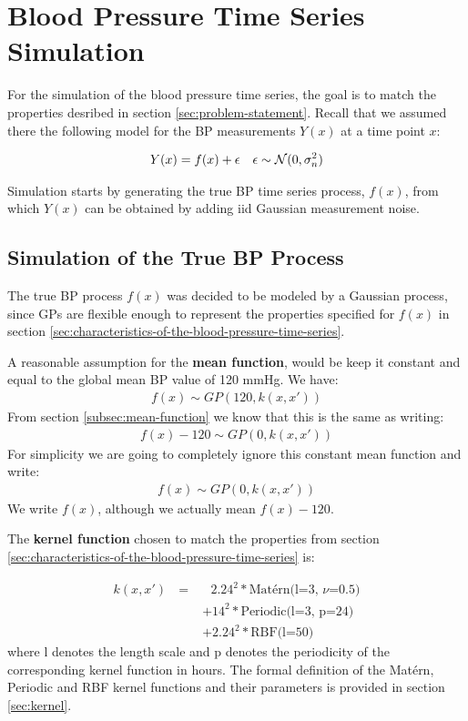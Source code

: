 \section{Blood Pressure Time Series Simulation}\label{sec:blood-pressure-time-series-simulation}
For the simulation of the blood pressure time series, the goal is to match the properties
desribed in section \ref{sec:problem-statement}.
Recall that we assumed there the following model for the BP measurements
$Y(x)$ at a time point $x$:

\begin{align*}
    Y(x) = f(x) + \epsilon && \epsilon \sim \operatorname{\mathcal{N}}(0, \sigma_n^{2})
\end{align*}

Simulation starts by generating the true BP time series process, $f(x)$,
from which $Y(x)$ can be obtained by adding iid Gaussian measurement noise.

\subsection{Simulation of the True BP Process}

The true BP process $f(x)$ was decided to be modeled by a Gaussian process,
since GPs are flexible enough to represent the properties
specified for $f(x)$ in section \ref{sec:characteristics-of-the-blood-pressure-time-series}.

A reasonable assumption for the \textbf{mean function}, would be keep it constant and
equal to the global mean BP value of 120 mmHg. We have:
\begin{gather*}
    f(x) \sim GP(120, k(x,x'))
\end{gather*}
From section \ref{subsec:mean-function} we know that this is the same as writing:
\begin{gather*}
    f(x) - 120 \sim GP(0, k(x,x'))
\end{gather*}
For simplicity we are going to completely ignore this constant
mean function and write:
\begin{gather*}
    f(x) \sim GP(0, k(x,x'))
\end{gather*}
We write $f(x)$, although we actually mean $f(x) - 120$.

The \textbf{kernel function} chosen to match the properties from
section \ref{sec:characteristics-of-the-blood-pressure-time-series} is:

\begin{align*}\label{def:true_gp}
    k(x, x') \text{ } = &\text{ } 2.24^{2} * \text{Matérn(l=3, $\nu$=0.5)} \\
             &+  14^{2} * \text{Periodic(l=3, p=24)} \\
             &+  2.24^{2} * \text{RBF(l=50)}
\end{align*}
where l denotes the length scale and p denotes the periodicity
of the corresponding kernel function in hours.
The formal definition of the Matérn, Periodic and RBF kernel
functions and their parameters is provided in section \ref{sec:kernel}.

